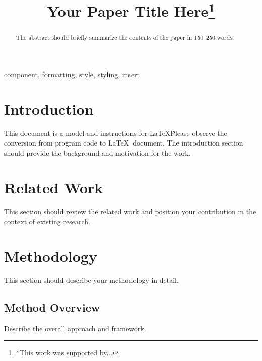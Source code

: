 \documentclass[conference,twocolumn]{IEEEtran}
\begin{document}
\title{Your Paper Title Here\thanks{*This work was supported by...}}

\author{
\and
{}
}

\maketitle

\begin{abstract}
The abstract should briefly summarize the contents of the paper in 150--250 words.
\end{abstract}

\begin{IEEEkeywords}
component, formatting, style, styling, insert
\end{IEEEkeywords}

\section{Introduction}
This document is a model and instructions for \LaTeX\. Please observe the
conversion from program code to \LaTeX\ document. The introduction section
should provide the background and motivation for the work.

\section{Related Work}
This section should review the related work and position your contribution
in the context of existing research.

\section{Methodology}
This section should describe your methodology in detail.

\subsection{Method Overview}
Describe the overall approach and framework.
\end{document}
